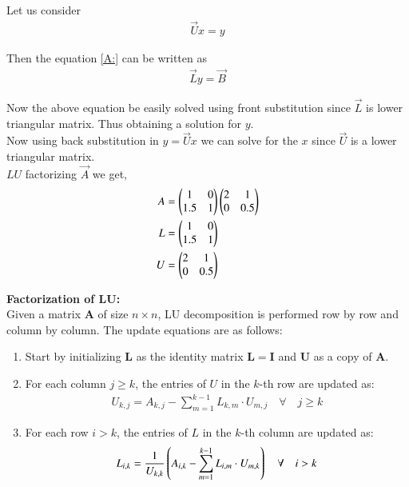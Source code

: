 \documentclass[journal]{IEEEtran}
\numberwithin{equation}{enumi}
\numberwithin{figure}{enumi}
\begin{document}
Let us consider
\begin{align}
    \Vec{U}x = y
\end{align}

Then the equation \eqref{A:} can be written as
\begin{align}
    \Vec{L}y = \Vec{B}
\end{align}

Now the above equation be easily solved using front substitution since $\Vec{L}$ is lower triangular matrix. Thus obtaining a solution for $y$.\\

Now using back substitution in $y = \Vec{U}x$ we can solve for the $x$ since $\Vec{U}$ is a lower triangular matrix.\\

$LU$ factorizing $\Vec{A}$ we get,
\begin{align}
    A &= \begin{pmatrix}1 & 0 \\ 1.5 & 1\end{pmatrix}\begin{pmatrix}2 & 1 \\ 0 & 0.5\end{pmatrix}\\
    L &= \begin{pmatrix}1 & 0 \\ 1.5 & 1\end{pmatrix}\\
    U &= \begin{pmatrix}2 & 1 \\ 0 & 0.5\end{pmatrix}
\end{align}

\textbf{Factorization of LU:}\\
Given a matrix $ \mathbf{A} $ of size $ n \times n $, LU decomposition is performed row by row and column by column. The update equations are as follows: 
\begin{enumerate}
    \item Start by initializing $ \mathbf{L} $ as the identity matrix $ \mathbf{L} = \mathbf{I} $ and $ \mathbf{U} $ as a copy of $ \mathbf{A} $.\\
    \item For each column $ j \geq k $, the entries of $ U $ in the $ k $-th row are updated as:
    \begin{align}
        U_{k,j} = A_{k,j} - \sum_{m=1}^{k-1} L_{k,m} \cdot U_{m,j}\quad \forall \quad j \geq k
    \end{align}
    \item For each row $ i > k $, the entries of $ L $ in the $ k $-th column are updated as:
    \begin{align}
        L_{i,k} = \frac{1}{U_{k,k}} \left( A_{i,k} - \sum_{m=1}^{k-1} L_{i,m} \cdot U_{m,k}\right) \quad \forall \quad i > k
    \end{align}
\end{enumerate}
\end{document}
